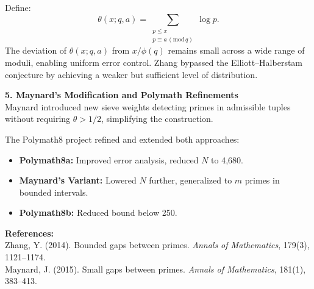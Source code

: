 \begin{technical}
Define:
\[
\theta(x; q, a) = \sum_{\substack{p \le x \\ p \equiv a \,(\mathrm{mod}\,q)}} \log p.
\]
The deviation of \( \theta(x; q, a) \) from \( x / \phi(q) \) remains small across a wide range of moduli, enabling uniform error control. Zhang bypassed the Elliott–Halberstam conjecture by achieving a weaker but sufficient level of distribution.

\vspace{0.7em}
\textbf{5. Maynard’s Modification and Polymath Refinements}\\[0.5em]
Maynard introduced new sieve weights detecting primes in admissible tuples without requiring \( \theta > 1/2 \), simplifying the construction.

The Polymath8 project refined and extended both approaches:
\begin{itemize}[leftmargin=*]
    \item \textbf{Polymath8a:} Improved error analysis, reduced \( N \) to 4,680.
    \item \textbf{Maynard's Variant:} Lowered \( N \) further, generalized to \( m \) primes in bounded intervals.
    \item \textbf{Polymath8b:} Reduced bound below 250.
\end{itemize}

\vspace{0.5em}
\textbf{References:}\\[0.3em]
Zhang, Y. (2014). Bounded gaps between primes. \textit{Annals of Mathematics}, 179(3), 1121–1174.\\
Maynard, J. (2015). Small gaps between primes. \textit{Annals of Mathematics}, 181(1), 383–413.

\end{technical}
